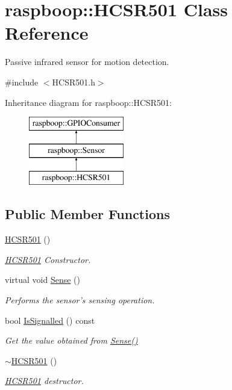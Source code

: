 \hypertarget{classraspboop_1_1HCSR501}{\section{raspboop\-:\-:H\-C\-S\-R501 Class Reference}
\label{classraspboop_1_1HCSR501}
}


Passive infrared sensor for motion detection.  




{\ttfamily \#include $<$H\-C\-S\-R501.\-h$>$}

Inheritance diagram for raspboop\-:\-:H\-C\-S\-R501\-:\begin{figure}[H]
\begin{center}
\leavevmode
\includegraphics[height=3.000000cm]{classraspboop_1_1HCSR501}
\end{center}
\end{figure}
\subsection*{Public Member Functions}
\begin{DoxyCompactItemize}
\item 
\hyperlink{classraspboop_1_1HCSR501_aeb198c632522d10e5319184ac85c303e}{H\-C\-S\-R501} ()
\begin{DoxyCompactList}\small\item\em \hyperlink{classraspboop_1_1HCSR501}{H\-C\-S\-R501} Constructor. \end{DoxyCompactList}\item 
virtual void \hyperlink{classraspboop_1_1HCSR501_ade0ae21c1bda3dabec68e0476d92520a}{Sense} ()
\begin{DoxyCompactList}\small\item\em Performs the sensor's sensing operation. \end{DoxyCompactList}\item 
bool \hyperlink{classraspboop_1_1HCSR501_a06f7b6c117ee5acf76592a3f89159a3e}{Is\-Signalled} () const 
\begin{DoxyCompactList}\small\item\em Get the value obtained from \hyperlink{classraspboop_1_1HCSR501_ade0ae21c1bda3dabec68e0476d92520a}{Sense()} \end{DoxyCompactList}\item 
\hypertarget{classraspboop_1_1HCSR501_a8a25051cf0c8ae1700b933419749366d}{\hyperlink{classraspboop_1_1HCSR501_a8a25051cf0c8ae1700b933419749366d}{$\sim$\-H\-C\-S\-R501} ()}\label{classraspboop_1_1HCSR501_a8a25051cf0c8ae1700b933419749366d}

\begin{DoxyCompactList}\small\item\em \hyperlink{classraspboop_1_1HCSR501}{H\-C\-S\-R501} destructor. \end{DoxyCompactList}\end{DoxyCompactItemize}
